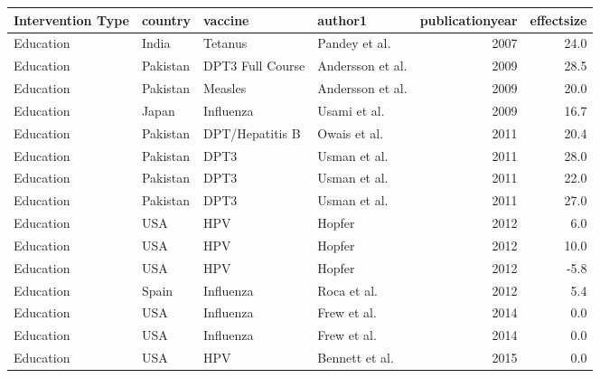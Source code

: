 
\begin{tabular}{llllrr}
\toprule
Intervention Type & country & vaccine & author1 & publicationyear & effectsize\\
\midrule
Education & India & Tetanus & Pandey et al. & 2007 & 24.0\\
Education & Pakistan & DPT3 Full Course & Andersson et al. & 2009 & 28.5\\
Education & Pakistan & Measles & Andersson et al. & 2009 & 20.0\\
Education & Japan & Influenza & Usami et al. & 2009 & 16.7\\
Education & Pakistan & DPT/Hepatitis B & Owais et al. & 2011 & 20.4\\
\addlinespace
Education & Pakistan & DPT3 & Usman et al. & 2011 & 28.0\\
Education & Pakistan & DPT3 & Usman et al. & 2011 & 22.0\\
Education & Pakistan & DPT3 & Usman et al. & 2011 & 27.0\\
Education & USA & HPV & Hopfer & 2012 & 6.0\\
Education & USA & HPV & Hopfer & 2012 & 10.0\\
\addlinespace
Education & USA & HPV & Hopfer & 2012 & -5.8\\
Education & Spain & Influenza & Roca et al. & 2012 & 5.4\\
Education & USA & Influenza & Frew et al. & 2014 & 0.0\\
Education & USA & Influenza & Frew et al. & 2014 & 0.0\\
Education & USA & HPV & Bennett et al. & 2015 & 0.0\\
\bottomrule
\end{tabular}
